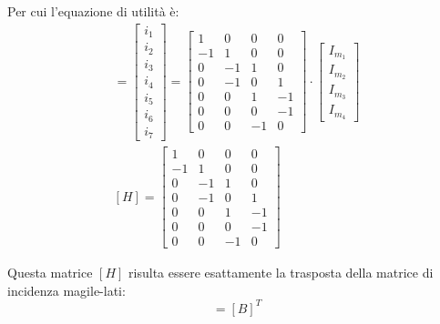 \documentclass{article}
\numberwithin{equation}{subsection}
\begin{document}
Per cui l'equazione di utilità è: 
\begin{gather*}
    [i_l]=\begin{bmatrix}
        i_1\\
        i_2\\
        i_3\\
        i_4\\
        i_5\\
        i_6\\
        i_7
    \end{bmatrix}=\begin{bmatrix}
        1&0&0&0\\
        -1&1&0&0\\
        0&-1&1&0\\
        0&-1&0&1\\
        0&0&1&-1\\
        0&0&0&-1\\
        0&0&-1&0
    \end{bmatrix}\cdot\begin{bmatrix}
        I_{m_1}\\
        I_{m_2}\\
        I_{m_3}\\
        I_{m_4}
    \end{bmatrix}\\
    [H]=\begin{bmatrix}
        1&0&0&0\\
        -1&1&0&0\\
        0&-1&1&0\\
        0&-1&0&1\\
        0&0&1&-1\\
        0&0&0&-1\\
        0&0&-1&0
    \end{bmatrix}
\end{gather*}

Questa matrice $[H]$ risulta essere esattamente la trasposta della matrice di incidenza magile-lati:
\begin{equation*}
    [H]=[B]^T
\end{equation*}
\end{document}
